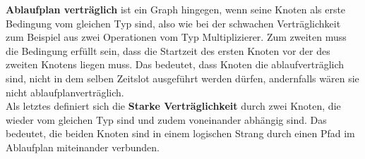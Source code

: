 \documentclass[conference]{IEEEtran}
\begin{document}
\textbf{Ablaufplan verträglich} ist ein Graph hingegen, wenn seine Knoten als erste Bedingung vom gleichen Typ sind, also wie bei der schwachen Verträglichkeit zum Beispiel aus zwei Operationen vom Typ Multiplizierer. Zum zweiten muss die Bedingung erfüllt sein, dass die Startzeit des ersten Knoten vor der des zweiten Knotens liegen muss. Das bedeutet, dass Knoten die ablaufverträglich sind, nicht in dem selben Zeitslot ausgeführt werden dürfen, andernfalls wären sie nicht ablaufplanverträglich\cite{?}.\\

Als letztes definiert sich die \textbf{Starke Verträglichkeit} durch zwei Knoten, die wieder vom gleichen Typ sind und zudem voneinander abhängig sind. Das bedeutet, die beiden Knoten sind in einem logischen Strang durch einen Pfad im Ablaufplan miteinander verbunden.\cite{?}
\end{document}
